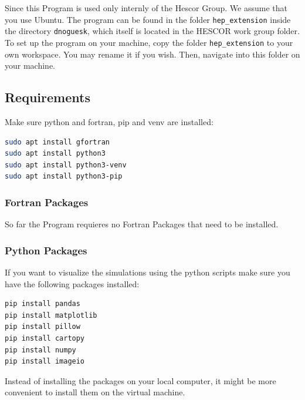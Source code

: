 \documentclass[11pt,a4paper]{article}
\begin{document}
Since this Program is used only internly of the Hescor Group. We assume that you use Ubuntu. The program can be found in the folder \texttt{hep\_extension} inside the directory \texttt{dnoguesk}, which itself is located in the HESCOR work group folder. To set up the program on your machine, copy the folder \texttt{hep\_extension} to your own workspace. You may rename it if you wish. Then, navigate into this folder on your machine.

\subsection{Requirements }
Make sure python and fortran, pip and venv are installed:
\begin{lstlisting}[language=bash]
sudo apt install gfortran
sudo apt install python3
sudo apt install python3-venv
sudo apt install python3-pip
\end{lstlisting}
\subsubsection{Fortran Packages}

So far the Program requieres no Fortran Packages that need to be installed. 

\subsubsection{Python Packages}\label{python_packages}
If you want to visualize the simulations using the python scripts make sure you have the following packages installed: 

\begin{lstlisting}[language=bash]
pip install pandas 
pip install matplotlib 
pip install pillow 
pip install cartopy 
pip install numpy 
pip install imageio
\end{lstlisting}

Instead of installing the packages on your local computer, it might be more convenient to install them on the virtual machine. 
\end{document}
